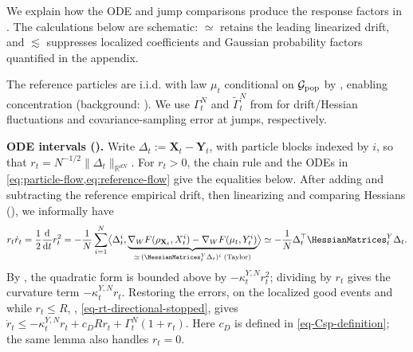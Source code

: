We explain how the ODE and jump comparisons produce the response factors
in . The calculations below are schematic:
\(\simeq\) retains the leading linearized drift, and \(\lesssim\) suppresses
localized coefficients and Gaussian probability factors quantified in the appendix.

The reference particles are i.i.d. with law \(\mu_t\) conditional on
\(\mathcal G_{\rm pop}\) by
,
enabling concentration (background: \citet{sznitman1991,fournier2015rate}).
We use \(\Gamma_t^N\) and \(\widetilde\Gamma_t^N\) from
 for drift/Hessian fluctuations
and covariance-sampling error at jumps, respectively.

\noindent
\textbf{ODE intervals ().}
Write \(\Delta_t:=\mathbf X_t-\mathbf Y_t\), with particle blocks indexed by \(i\),
so that \(r_t=N^{-1/2}\|\Delta_t\|_{\mathbb R^{dN}}\).
For \(r_t>0\), the chain rule and the ODEs in
\cref{eq:particle-flow,eq:reference-flow} give the equalities below. After adding and subtracting the reference empirical drift,
then linearizing and comparing Hessians
(), we informally have
\[
 r_t\dot r_t=\frac12\frac{\mathrm d}{\mathrm dt}r_t^2
 =-\frac1N\sum_{i=1}^N\bigl\langle\Delta_t^i,
 \underbrace{\nabla_WF(\rho_{\mathbf X_t},X_t^i)-\nabla_WF(\mu_t,Y_t^i)}_{
 \simeq\,(\HessianMatrices_t^Y\Delta_t)^i\;\text{(Taylor)}}\bigr\rangle
 \simeq-\frac1N\Delta_t^\top\HessianMatrices_t^Y\Delta_t.
\]
By , the quadratic form is bounded above by
\(-\kappa_t^{Y,N}r_t^2\); dividing by \(r_t\) gives the curvature term
\(-\kappa_t^{Y,N}r_t\).
Restoring the errors, on the localized good events and while \(r_t\le R\),
,
\eqref{eq-rt-directional-stopped}, gives
\(\dot r_t\le-\kappa_t^{Y,N}r_t+c_DRr_t+\Gamma_t^N(1+r_t)\).
Here \(c_D\) is defined in \eqref{eq-Csp-definition}; the same lemma
also handles \(r_t=0\).

